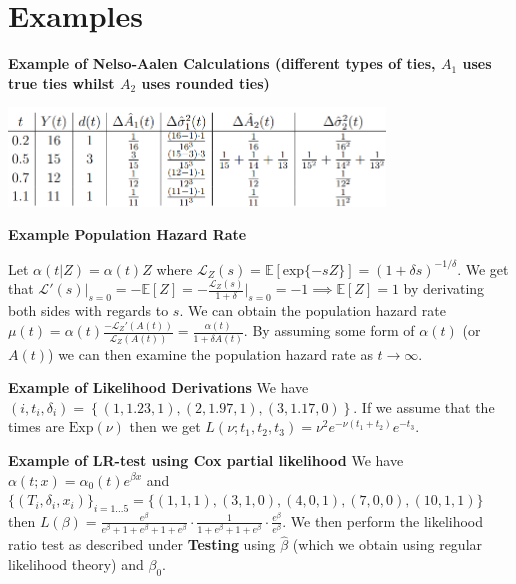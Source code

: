 \documentclass{article}
\begin{document}
\section*{Examples}

\textbf{Example of Nelso-Aalen Calculations (different types of ties, $A_1$ uses true ties whilst $A_2$ uses rounded ties)} 

\includegraphics[width=10cm]{surv_table.png}

\medskip

\textbf{Example Population Hazard Rate}

Let $\alpha(t|Z) = \alpha(t)Z$ where $\mathcal{L}_Z(s) = \mathbb{E}[\text{exp}\{-sZ\}] = (1+\delta s)^{-1/\delta}$. We get that $\mathcal{L}'(s)\big|_{s=0}  = -\mathbb{E}[Z] = -\frac{\mathcal{L}_Z(s)}{1+\delta }\big|_{s=0} = -1 \implies \mathbb{E}[Z] = 1$ by derivating both sides with regards to $s$. We can obtain the population hazard rate $\mu(t) = \alpha(t)\frac{-\mathcal{L}_Z'(A(t))}{\mathcal{L}_Z(A(t))} = \frac{\alpha(t)}{1 + \delta A(t)}$. By assuming some form of $\alpha(t)$ (or $A(t)$) we can then examine the population hazard rate as $t \to \infty$. 

\medskip

\textbf{Example of Likelihood Derivations} We have $(i, t_i, \delta_i) = \left\{(1,1.23,1),(2,1.97,1),(3, 1.17, 0)\right\}$. If we assume that the times are $\text{Exp}(\nu)$ then we get $L(\nu; t_1, t_2, t_3) = \nu^2 e^{-\nu(t_1 + t_2)} e^{-t_3}$. 

\medskip

\textbf{Example of LR-test using Cox partial likelihood}
We have $\alpha(t; x) = \alpha_0(t)e^{\beta x}$ and 
$\{(T_i, \delta_i, x_i)\}_{i=1...5} = \{(1, 1, 1),(3, 1, 0),(4, 0, 1),(7, 0, 0),(10, 1, 1) \}$ then $L(\beta) = \frac{e^{\beta}}{e^{\beta}+1+e^{\beta}+1+e^{\beta}} \cdot \frac{1}{1+e^{\beta}+1+e^{\beta}} \cdot \frac{e^{\beta}}{e^{\beta}}$. We then perform the likelihood ratio test as described under \textbf{Testing} using $\hat\beta$ (which we obtain using regular likelihood theory) and $\beta_0$. 
\end{document}
